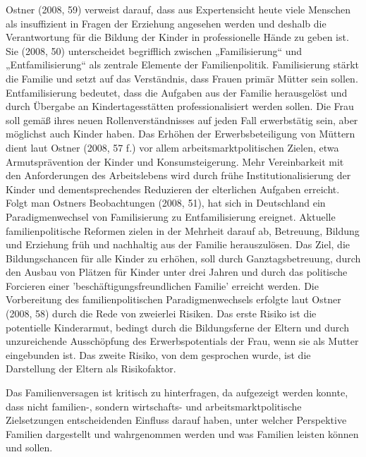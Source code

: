 Ostner (2008, 59) verweist darauf, dass aus Expertensicht heute viele Menschen als insuffizient in Fragen der Erziehung angesehen werden und deshalb die Verantwortung für die Bildung der Kinder in professionelle Hände zu geben ist. Sie (2008, 50) unterscheidet begrifflich zwischen „Familisierung“ und „Entfamilisierung“ als zentrale Elemente der Familienpolitik. Familisierung stärkt die Familie und setzt auf das Verständnis, dass Frauen primär Mütter sein sollen. Entfamilisierung bedeutet, dass die Aufgaben aus der Familie herausgelöst und durch Übergabe an Kindertagesstätten professionalisiert werden sollen. Die Frau soll gemäß ihres neuen Rollenverständnisses auf jeden Fall erwerbstätig sein, aber möglichst auch Kinder haben.  
Das Erhöhen der Erwerbsbeteiligung von Müttern dient laut Ostner (2008, 57 f.) vor allem arbeitsmarktpolitischen Zielen, etwa Armutsprävention der Kinder und Konsumsteigerung. 
Mehr Vereinbarkeit mit den Anforderungen des Arbeitslebens wird durch frühe Institutionalisierung der Kinder und dementsprechendes Reduzieren der elterlichen Aufgaben erreicht. Folgt man Ostners Beobachtungen (2008, 51), hat sich in Deutschland ein Paradigmenwechsel von Familisierung zu Entfamilisierung ereignet. Aktuelle familienpolitische Reformen zielen in der Mehrheit darauf ab, Betreuung, Bildung und Erziehung früh und nachhaltig aus der Familie herauszulösen. Das Ziel, die Bildungschancen für alle Kinder zu erhöhen, soll durch Ganztagsbetreuung, durch den Ausbau von Plätzen für Kinder unter drei Jahren und durch das politische Forcieren einer 'beschäftigungsfreundlichen Familie' erreicht werden. Die Vorbereitung des familienpolitischen Paradigmenwechsels erfolgte laut Ostner (2008, 58) durch die Rede von zweierlei Risiken. Das erste Risiko ist die potentielle Kinderarmut, bedingt durch die Bildungsferne der Eltern und durch unzureichende Ausschöpfung des Erwerbspotentials der Frau, wenn sie als Mutter eingebunden ist. Das zweite Risiko, von dem gesprochen wurde, ist die Darstellung der Eltern als Risikofaktor.  

Das Familienversagen ist kritisch zu hinterfragen, da aufgezeigt werden konnte, dass nicht familien-, sondern wirtschafts- und arbeitsmarktpolitische Zielsetzungen entscheidenden Einfluss darauf haben, unter welcher Perspektive Familien dargestellt und wahrgenommen werden und was Familien leisten können und sollen.
 

